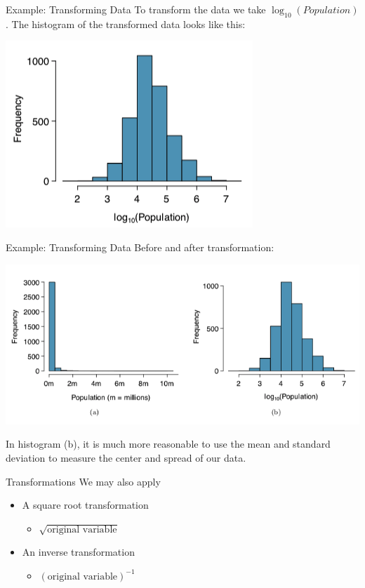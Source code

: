 \begin{frame}{Example: Transforming Data}
    To transform the data we take $\log_{10}(Population)$. The histogram of the transformed data looks like this:
    \begin{center}
        \includegraphics[scale=0.5]{images/trans2.png}
    \end{center}
\end{frame}

\begin{frame}{Example: Transforming Data}
    Before and after transformation:
    \begin{center}
        \includegraphics[scale=0.45]{images/transform.png}
    \end{center}
    In histogram (b), it is much more reasonable to use the mean and standard deviation to measure the center and spread of our data.
\end{frame}

\begin{frame}{Transformations}
    We may also apply
    \begin{itemize}
        \item A square root transformation
        \begin{itemize}
            \item $\sqrt{\text{original variable}}$
        \end{itemize}
        \item An inverse transformation
        \begin{itemize}
            \item $(\text{original variable})^{-1}$
        \end{itemize}
    \end{itemize}
\end{frame}

